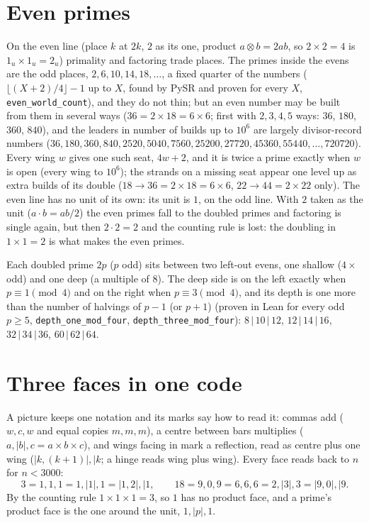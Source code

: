 \documentclass[11pt]{article}
\begin{document}
\section{Even primes}
On the even line (place $k$ at $2k$, $2$ as its one, product $a\otimes b = 2ab$, so $2\times2 = 4$ is $1_u\times1_u = 2_u$) primality and factoring trade places. The primes inside the evens are the odd places, $2,6,10,14,18,\dots$, a fixed quarter of the numbers ($\lfloor (X+2)/4\rfloor - 1$ up to $X$, found by PySR and proven for every $X$, \texttt{even\_world\_count}), and they do not thin; but an even number may be built from them in several ways ($36 = 2\times18 = 6\times6$; first with $2,3,4,5$ ways: $36$, $180$, $360$, $840$), and the leaders in number of builds up to $10^6$ are largely divisor-record numbers ($36, 180, 360, 840, 2520, 5040, 7560, 25200, 27720, 45360, 55440, \dots, 720720$). Every wing $w$ gives one such seat, $4w+2$, and it is twice a prime exactly when $w$ is open (every wing to $10^6$); the strands on a missing seat appear one level up as extra builds of its double ($18\to36 = 2\times18 = 6\times6$, $22\to44 = 2\times22$ only). The even line has no unit of its own: its unit is $1$, on the odd line. With $2$ taken as the unit ($a\cdot b = ab/2$) the even primes fall to the doubled primes and factoring is single again, but then $2\cdot2 = 2$ and the counting rule is lost: the doubling in $1\times1 = 2$ is what makes the even primes.

Each doubled prime $2p$ ($p$ odd) sits between two left-out evens, one shallow ($4\times$ odd) and one deep (a multiple of $8$). The deep side is on the left exactly when $p\equiv1\pmod4$ and on the right when $p\equiv3\pmod4$, and its depth is one more than the number of halvings of $p-1$ (or $p+1$) (proven in Lean for every odd $p\ge5$, \texttt{depth\_one\_mod\_four}, \texttt{depth\_three\_mod\_four}): $8\,|\,10\,|\,12$, $12\,|\,14\,|\,16$, $32\,|\,34\,|\,36$, $60\,|\,62\,|\,64$.

\section{Three faces in one code}
A picture keeps one notation and its marks say how to read it: commas add ($w,c,w$ and equal copies $m,m,m$), a centre between bars multiplies ($a,|b|,c = a\times b\times c$), and wings facing in mark a reflection, read as centre plus one wing ($|k,(k{+}1)|,|k$; a hinge reads wing plus wing). Every face reads back to $n$ for $n<3000$:
\[ 3 = 1,1,1 = 1,|1|,1 = |1,2|,|1,\qquad 18 = 9,0,9 = 6,6,6 = 2,|3|,3 = |9,0|,|9. \]
By the counting rule $1\times1\times1 = 3$, so $1$ has no product face, and a prime's product face is the one around the unit, $1,|p|,1$.
\end{document}
